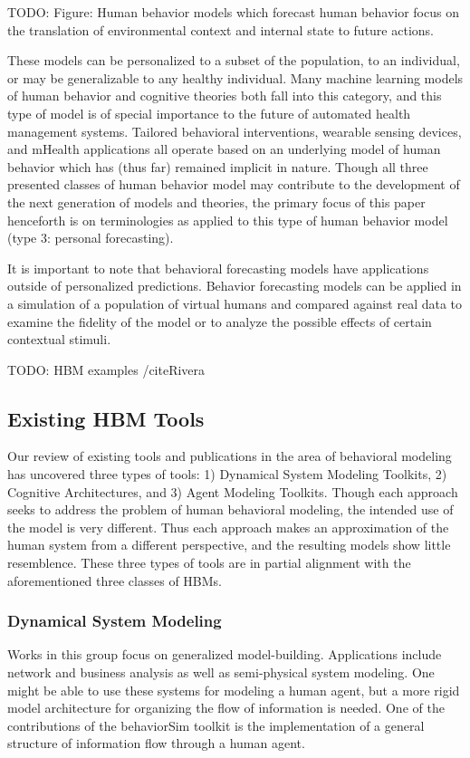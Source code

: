 TODO: Figure: Human behavior models which forecast human behavior focus on the translation of environmental context and internal state to future actions.

These models can be personalized to a subset of the population, to an individual, or may be generalizable to any healthy individual. 
Many machine learning models of human behavior and cognitive theories both fall into this category, and this type of model is of special importance to the future of automated health management systems. 
Tailored behavioral interventions, wearable sensing devices, and mHealth applications all operate based on an underlying model of human behavior which has (thus far) remained implicit in nature. 
Though all three presented classes of human behavior model may contribute to the development of the next generation of models and theories, the primary focus of this paper henceforth is on terminologies as applied to this type of human behavior model (type 3: personal forecasting).

It is important to note that behavioral forecasting models have applications outside of personalized predictions. 
Behavior forecasting models can be applied in a simulation of a population of virtual humans and compared against real data to examine the fidelity of the model or to analyze the possible effects of certain contextual stimuli. 

TODO: HBM examples /cite{Rivera}


\subsection{Existing HBM Tools}
Our review of existing tools and publications in the area of behavioral modeling has uncovered three types of tools: 1) Dynamical System Modeling Toolkits, 2) Cognitive Architectures, and 3) Agent Modeling Toolkits. 
Though each approach seeks to address the problem of human behavioral modeling, the intended use of the model is very different. 
Thus each approach makes an approximation of the human system from a different perspective, and the resulting models show little resemblence.
These three types of tools are in partial alignment with the aforementioned three classes of HBMs.

\subsubsection{Dynamical System Modeling}
Works in this group focus on generalized model-building. 
Applications include network and business analysis as well as semi-physical system modeling. 
One might be able to use these systems for modeling a human agent, but a more rigid model architecture for organizing the flow of information is needed. 
One of the contributions of the behaviorSim toolkit is the implementation of a general structure of information flow through a human agent.

